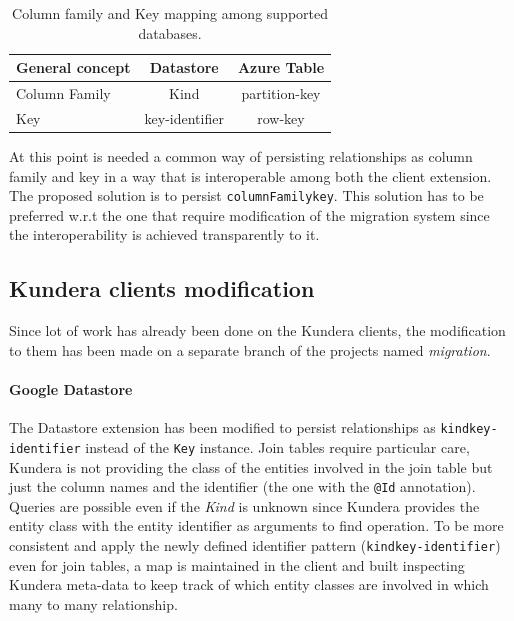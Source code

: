 \begin{table}[h]
\centering
\vspace{1em}
\renewcommand{\arraystretch}{1.4}
\begin{tabular}{lcc}
\hline
\textbf{General concept} & \textbf{Datastore} & \textbf{Azure Table}\\ 
\hline\hline
Column Family & Kind & partition-key \\
\hline
Key & key-identifier & row-key \\
\hline
\end{tabular}
\caption{Column family and Key mapping among supported databases.}
\label{table:mapping}
\end{table}

\noindent At this point is needed a common way of persisting relationships as column family and key in a way that is interoperable among both the client extension.
The proposed solution is to persist \texttt{columnFamily\textunderscore key}. This solution has to be preferred w.r.t the one that require modification of the migration system since the interoperability is achieved transparently to it.

\subsection{Kundera clients modification}
Since lot of work has already been done on the Kundera clients, the modification to them has been made on a separate branch of the projects named \textit{migration}.

\paragraph{Google Datastore} The Datastore extension has been modified to persist relationships as \texttt{kind\textunderscore key-identifier} instead of the \texttt{Key} instance.
Join tables require particular care, Kundera is not providing the class of the entities involved in the join table but just the column names and the identifier (the one with the \texttt{@Id} annotation). Queries are possible even if the \textit{Kind} is unknown since Kundera provides the entity class with the entity identifier as arguments to find operation.
To be more consistent and apply the newly defined identifier pattern (\texttt{kind\textunderscore key-identifier}) even for join tables, a map is maintained in the client and built inspecting Kundera meta-data to keep track of which entity classes are involved in which many to many relationship.

